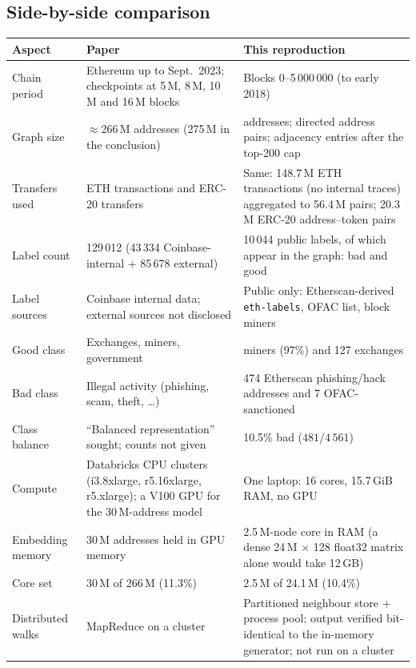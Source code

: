 \documentclass[11pt,a4paper]{article}
\begin{document}
\subsection{Side-by-side comparison}
\begin{table}[H]
\centering\footnotesize
\begin{tabular}{p{3.0cm} p{5.9cm} p{6.3cm}}
\toprule
\textbf{Aspect} & \textbf{Paper} & \textbf{This reproduction}\\
\midrule
Chain period & Ethereum up to Sept.\ 2023; checkpoints at 5\,M, 8\,M, 10\,M and 16\,M blocks & Blocks 0--5\,000\,000 (to early 2018)\\
Graph size & $\approx$266\,M addresses (275\,M in the conclusion) & \NumNodes{} addresses; \NumPairs{} directed address pairs; \NumAdj{} adjacency entries after the top-200 cap\\
Transfers used & ETH transactions and ERC-20 transfers & Same: 148.7\,M ETH transactions (no internal traces) aggregated to 56.4\,M pairs; 20.3\,M ERC-20 address--token pairs\\
Label count & 129\,012 (43\,334 Coinbase-internal + 85\,678 external) & 10\,044 public labels, of which \NumLabeled{} appear in the graph: \NumBad{} bad and \NumGood{} good\\
Label sources & Coinbase internal data; external sources not disclosed & Public only: Etherscan-derived \texttt{eth-labels}, OFAC list, block miners\\
Good class & Exchanges, miners, government & \NumMiners{} miners (97\%) and 127 exchanges\\
Bad class & Illegal activity (phishing, scam, theft, \dots) & 474 Etherscan phishing/hack addresses and 7 OFAC-sanctioned\\
Class balance & ``Balanced representation'' sought; counts not given & 10.5\% bad ($481/4\,561$)\\
Compute & Databricks CPU clusters (i3.8xlarge, r5.16xlarge, r5.xlarge); a V100 GPU for the 30\,M-address model & One laptop: 16 cores, 15.7\,GiB RAM, no GPU\\
Embedding memory & 30\,M addresses held in GPU memory & 2.5\,M-node core in RAM (a dense 24\,M $\times$ 128 float32 matrix alone would take 12\,GB)\\
Core set & 30\,M of 266\,M (11.3\%) & 2.5\,M of 24.1\,M (10.4\%)\\
Distributed walks & MapReduce on a cluster & Partitioned neighbour store + process pool; output verified bit-identical to the in-memory generator; not run on a cluster\\

\end{tabular}
\end{table}
\end{document}

